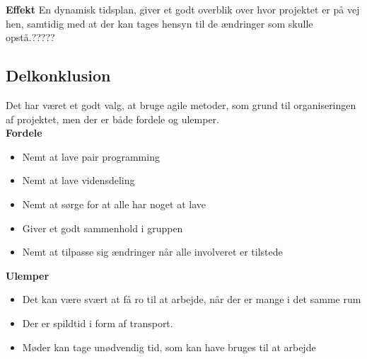 \textbf{Effekt}
En dynamisk tidsplan, giver et godt overblik over hvor projektet er på vej hen, samtidig med at der kan tages hensyn til de ændringer som skulle opstå.?????

\subsection{Delkonklusion}
Det har været et godt valg, at bruge agile metoder, som grund til organiseringen af projektet, men der er både fordele og ulemper.\\

\textbf{Fordele}
\begin{itemize}
	\item Nemt at lave pair programming
	\item Nemt at lave vidensdeling
	\item Nemt at sørge for at alle har noget at lave
	\item Giver et godt sammenhold i gruppen
	\item Nemt at tilpasse sig ændringer når alle involveret er tilstede
\end{itemize}

\textbf{Ulemper}
\begin{itemize}
	\item Det kan være svært at få ro til at arbejde, når der er mange i det samme rum
	\item Der er spildtid i form af transport.
	\item Møder kan tage unødvendig tid, som kan have bruges til at arbejde
\end{itemize}
